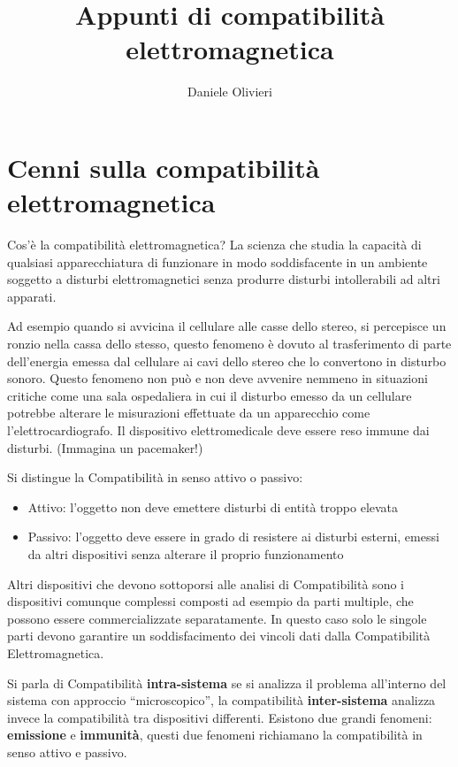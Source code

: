 \documentclass[a4paper,11pt]{scrartcl}
\title{Appunti di compatibilità elettromagnetica}
\author{Daniele Olivieri}
\date{}
\begin{document}
\maketitle

\section{Cenni sulla compatibilità elettromagnetica}

Cos'è la compatibilità elettromagnetica? La scienza che studia la capacità di qualsiasi 
apparecchiatura di funzionare in modo soddisfacente in un ambiente soggetto a disturbi elettromagnetici
senza produrre disturbi intollerabili ad altri apparati.

Ad esempio quando si avvicina il cellulare alle casse dello stereo, si percepisce un ronzio nella cassa
dello stesso, questo fenomeno è dovuto al trasferimento di parte dell'energia emessa dal cellulare ai cavi 
dello stereo che lo convertono in disturbo sonoro.
Questo fenomeno non può e non deve avvenire nemmeno in situazioni critiche come una sala ospedaliera in cui il disturbo
emesso da un cellulare potrebbe alterare le misurazioni effettuate da un apparecchio come l'elettrocardiografo.
Il dispositivo elettromedicale deve essere reso immune dai disturbi. (Immagina un pacemaker!)

Si distingue la Compatibilità in senso attivo o passivo:
\begin{itemize}
 \item Attivo: l'oggetto non deve emettere disturbi di entità troppo elevata
 \item Passivo: l'oggetto deve essere in grado di resistere ai disturbi esterni, emessi da altri dispositivi
 senza alterare il proprio funzionamento
\end{itemize}

Altri dispositivi che devono sottoporsi alle analisi di Compatibilità sono i dispositivi comunque complessi
composti ad esempio da parti multiple, che possono essere commercializzate separatamente. In questo caso solo
le singole parti devono garantire un soddisfacimento dei vincoli dati dalla Compatibilità Elettromagnetica.

Si parla di Compatibilità \textbf{intra-sistema} se si analizza il problema all'interno del sistema con approccio
``microscopico'', la compatibilità \textbf{inter-sistema} analizza invece la compatibilità tra dispositivi differenti.
Esistono due grandi fenomeni: \textbf{emissione} e \textbf{immunità}, questi due fenomeni richiamano la compatibilità in senso attivo e passivo.
\end{document}
